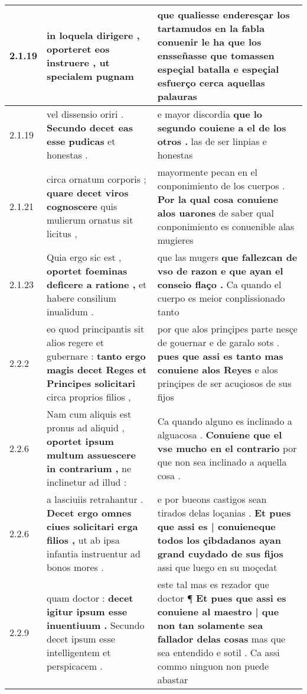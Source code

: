 \begin{tabular}{|p{1cm}|p{6.5cm}|p{6.5cm}|}
2.1.19 & in loquela dirigere , \textbf{ oporteret eos instruere , } ut specialem pugnam & que qualiesse enderesçar los tartamudos en la fabla conuenir le ha \textbf{ que los ensseñasse que tomassen espeçial batalla } e espeçial esfuerço cerca aquellas palauras \\\hline
2.1.19 & vel dissensio oriri . \textbf{ Secundo decet eas esse pudicas } et honestas . & e mayor discordia \textbf{ que lo segundo couiene a el de los otros . } las de ser linpias e honestas \\\hline
2.1.21 & circa ornatum corporis ; \textbf{ quare decet viros cognoscere } quis mulierum ornatus sit licitus , & mayormente pecan en el conponimiento de los cuerpos . \textbf{ Por la qual cosa conuiene alos uarones } de saber qual conponimiento es conuenible alas mugieres \\\hline
2.1.23 & Quia ergo sic est , \textbf{ oportet foeminas deficere a ratione , } et habere consilium inualidum . & que las mugers \textbf{ que fallezcan de vso de razon e que ayan el conseio flaço . } Ca quando el cuerpo es meior conplissionado tanto \\\hline
2.2.2 & eo quod principantis sit alios regere et gubernare : \textbf{ tanto ergo magis decet Reges et Principes solicitari } circa proprios filios , & por que alos prinçipes parte nesçe de gouernar e de garalo sots . \textbf{ pues que assi es tanto mas conuiene alos Reyes } e alos prinçipes de ser acuçiosos de sus fijos \\\hline
2.2.6 & Nam cum aliquis est pronus ad aliquid , \textbf{ oportet ipsum multum assuescere in contrarium , } ne inclinetur ad illud : & Ca quando alguno es inclinado a alguacosa . \textbf{ Conuiene que el vse mucho en el contrario } por que non sea inclinado a aquella cosa . \\\hline
2.2.6 & a lasciuiis retrahantur . \textbf{ Decet ergo omnes ciues solicitari erga filios , } ut ab ipsa infantia instruentur ad bonos mores . & e por bueons castigos sean tirados delas loçanias . \textbf{ Et pues que assi es | conuieneque todos los çibdadanos ayan grand cuydado de sus fijos } assi que luego en su moçedat \\\hline
2.2.9 & quam doctor : \textbf{ decet igitur ipsum esse inuentiuum . } Secundo decet ipsum esse intelligentem et perspicacem . & este tal mas es rezador que doctor ¶ \textbf{ Et pues que assi es conuiene al maestro | que non tan solamente sea fallador delas cosas } mas que sea entendido e sotil . Ca assi commo ninguon non puede abastar \\\hline

\end{tabular}

